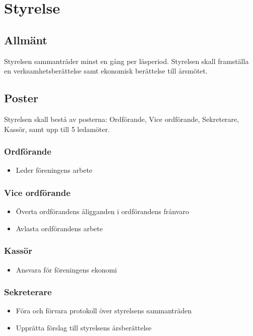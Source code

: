 \section{Styrelse}

\subsection{Allmänt}
Styrelsen sammanträder minst en gång per läsperiod. Styrelsen skall framställa en
verksamhetsberättelse samt ekonomisk berättelse till årsmötet.

\subsection{Poster}
Styrelsen skall bestå av posterna: Ordförande, Vice ordförande, Sekreterare, Kassör,
samt upp till 5 ledamöter.

\subsubsection{Ordförande}
\begin{itemize}
    \item Leder föreningens arbete
\end{itemize}

\subsubsection{Vice ordförande}
\begin{itemize}
    \item Överta ordförandens åligganden i ordförandens frånvaro
    \item Avlasta ordförandens arbete
\end{itemize}

\subsubsection{Kassör}
\begin{itemize}
    \item Ansvara för föreningens ekonomi
\end{itemize}
\subsubsection{Sekreterare}
\begin{itemize}
    \item Föra och förvara protokoll över styrelsens sammanträden
    \item Upprätta förslag till styrelsens årsberättelse
\end{itemize}

